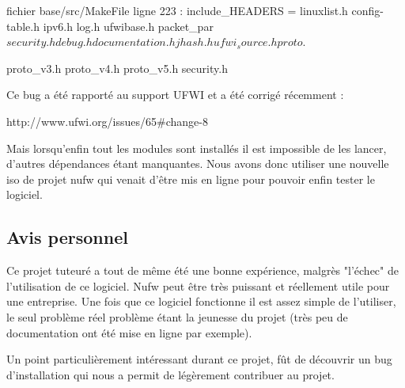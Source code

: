 \documentclass[12pt]{report}
\begin{document}
\begin{itemize}
fichier base/src/MakeFile
ligne 223 :
include\_HEADERS = linuxlist.h config-table.h ipv6.h log.h ufwibase.h packet\_par$
security.h debug.h documentation.h jhash.h ufwi_source.h proto.$

proto\_v3.h proto\_v4.h proto\_v5.h security.h

Ce bug a été rapporté au support UFWI et a été corrigé récemment : 

http://www.ufwi.org/issues/65\#change-8

Mais lorsqu'enfin tout les modules sont installés il est impossible de les lancer, d'autres dépendances étant manquantes.
Nous avons donc utiliser une nouvelle iso de projet nufw qui venait d'être mis en ligne pour pouvoir enfin tester le logiciel.


\subsection{Avis personnel}


Ce projet tuteuré a tout de même été une bonne expérience, malgrès "l'échec" de l'utilisation de ce logiciel. 
Nufw peut être très puissant et réellement utile pour une entreprise. Une fois que ce logiciel fonctionne il est assez 
simple de l'utiliser, le seul problème réel problème étant la jeunesse du projet (très peu de documentation ont été mise en ligne par exemple).

Un point particulièrement intéressant durant ce projet, fût de découvrir un bug d'installation qui nous a permit de légèrement contribuer au projet.


\end{itemize}
\end{document}
